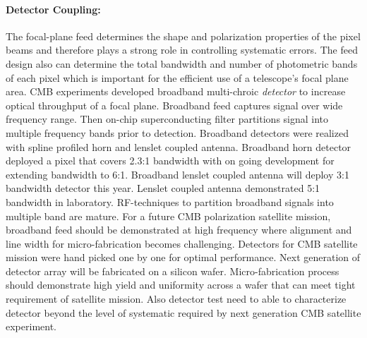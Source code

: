 \paragraph{Detector Coupling:} 
The focal-plane feed determines the shape and polarization properties of the pixel beams and therefore plays a strong role in controlling systematic errors. 
The feed design also can determine the total bandwidth and number of photometric bands of each pixel which is important for the efficient use of a telescope's focal plane area. 
CMB experiments developed broadband multi-chroic {\it detector} to increase optical throughput of a focal plane. 
Broadband feed captures signal over wide frequency range. 
Then on-chip superconducting filter partitions signal into multiple frequency bands prior to detection. 
Broadband detectors were realized with spline profiled horn and lenslet coupled antenna. 
Broadband horn detector deployed a pixel that covers 2.3:1 bandwidth with on going development for extending bandwidth to 6:1.
Broadband lenslet coupled antenna will deploy 3:1 bandwidth detector this year.
Lenslet coupled antenna demonstrated 5:1 bandwidth in laboratory. 
RF-techniques to partition broadband signals into multiple band are mature.
For a future CMB polarization satellite mission, broadband feed should be demonstrated at high frequency where alignment and line width for micro-fabrication becomes challenging. 
Detectors for CMB satellite mission were hand picked one by one for optimal performance.
Next generation of detector array will be fabricated on a silicon wafer. 
Micro-fabrication process should demonstrate high yield and uniformity across a wafer that can meet tight requirement of satellite mission.
Also detector test need to able to characterize detector beyond the level of systematic required by next generation CMB satellite experiment.

